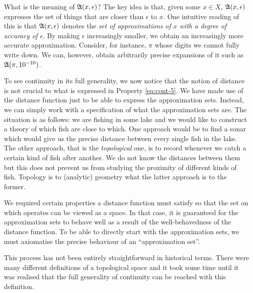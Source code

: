 What is the meaning of $\mathfrak{A}(x, \epsilon)$? The key idea is that, given some $x \in X$,
$\mathfrak{A}(x, \epsilon)$ expresses the set of things that are closer than $\epsilon$ to $x$. One intuitive
reading of this is that $\mathfrak{A}(x, \epsilon)$ denotes the \emph{set of approximations of $x$ with
a degree of accuracy of $\epsilon$}. By making $\epsilon$ increasingly smaller, we obtain an
increasingly more accurate approximation. Consider, for instance, $\pi$ whose digits we
cannot fully write down. We can, however, obtain arbitrarily precise expansions of it such
as $\mathfrak{A}(\pi, 10^{-10})$.

To see continuity in its full generality, we now notice that the notion of distance is not
crucial to what is expressed in Property \ref{eq:cont-5}. We have made use of the distance
function just to be able to express the approximation sets. Instead, we can simply work
with a specification of what the approximation sets are. The situation is as follows: we
are fishing in some lake and we would like to construct a theory of which fish are close
to which. One approach would be to find a sonar which would give us the precise distance
between every single fish in the lake. The other approach, that is the \emph{topological}
one, is to record whenever we catch a certain kind of fish after another. We do not know
the distances between them but this does not prevent us from studying the proximity of
different kinds of fish. Topology is to (analytic) geometry what the latter approach is to
the former.

We required certain properties a distance function must satisfy so that the set on which
operates can be viewed as a space. In that case, it is guaranteed for the approximation
sets to behave well as a result of the well-behavedness of the distance function. To be
able to directly start with the approximation sets, we must axiomatise the precise
behaviour of an ``approximation set''.

This process has not been entirely straightforward
in historical terms. There were many different definitions of a topological space and it
took some time until it was realised that the full generality of continuity can be reached
with this definition.


